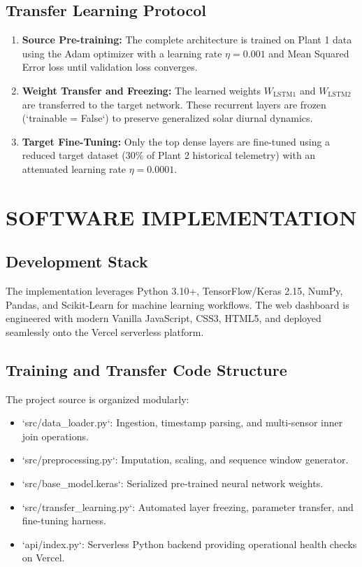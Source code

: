 \documentclass[12pt,a4paper,oneside]{report}
\begin{document}
\section{Transfer Learning Protocol}
\begin{enumerate}
    \item \textbf{Source Pre-training:} The complete architecture is trained on Plant 1 data using the Adam optimizer with a learning rate $\eta = 0.001$ and Mean Squared Error loss until validation loss converges.
    \item \textbf{Weight Transfer and Freezing:} The learned weights $W_{\text{LSTM1}}$ and $W_{\text{LSTM2}}$ are transferred to the target network. These recurrent layers are frozen (`trainable = False`) to preserve generalized solar diurnal dynamics.
    \item \textbf{Target Fine-Tuning:} Only the top dense layers are fine-tuned using a reduced target dataset (30\% of Plant 2 historical telemetry) with an attenuated learning rate $\eta = 0.0001$.
\end{enumerate}

\newpage
\chapter{SOFTWARE IMPLEMENTATION}

\section{Development Stack}
The implementation leverages Python 3.10+, TensorFlow/Keras 2.15, NumPy, Pandas, and Scikit-Learn for machine learning workflows. The web dashboard is engineered with modern Vanilla JavaScript, CSS3, HTML5, and deployed seamlessly onto the Vercel serverless platform.

\section{Training and Transfer Code Structure}
The project source is organized modularly:
\begin{itemize}
    \item `src/data_loader.py`: Ingestion, timestamp parsing, and multi-sensor inner join operations.
    \item `src/preprocessing.py`: Imputation, scaling, and sequence window generator.
    \item `src/base_model.keras`: Serialized pre-trained neural network weights.
    \item `src/transfer_learning.py`: Automated layer freezing, parameter transfer, and fine-tuning harness.
    \item `api/index.py`: Serverless Python backend providing operational health checks on Vercel.
\end{itemize}
\end{document}
